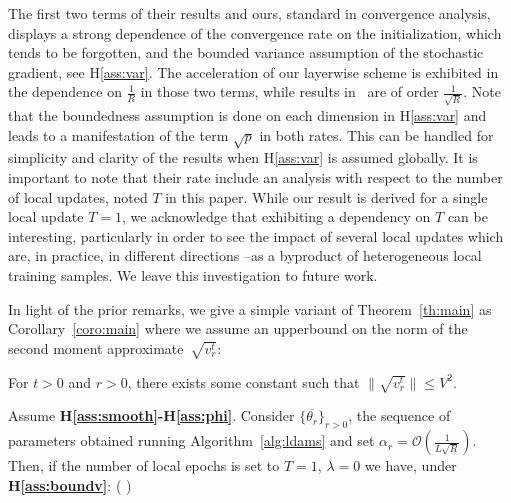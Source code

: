 \documentclass{article}
\begin{document}
The first two terms of their results and ours, standard in convergence analysis, displays a strong dependence of the convergence rate on the initialization, which tends to be forgotten, and the bounded variance assumption of the stochastic gradient, see H\ref{ass:var}.
The acceleration of our layerwise scheme is exhibited in the dependence on $\frac{1}{R}$ in those two terms, while results in~\citet{chen2020toward} are of order $\frac{1}{\sqrt{R}}$.
Note that the boundedness assumption is done on each dimension in H\ref{ass:var} and leads to a manifestation of the term $\sqrt{p}$ in both rates. This can be handled for simplicity and clarity of the results when H\ref{ass:var} is assumed globally.
It is important to note that their rate include an analysis with respect to the number of local updates, noted $T$ in this paper.
While our result is derived for a single local update $T=1$, we acknowledge that exhibiting a dependency on $T$ can be interesting, particularly in order to see the impact of several local updates which are, in practice, in different directions --as a byproduct of heterogeneous local training samples.
We leave this investigation to future work.

\medskip

In light of the prior remarks, we give a simple variant of Theorem~\ref{th:main} as Corollary~\ref{coro:main} where we assume an upperbound on the norm of the second moment approximate~$\sqrt{ v_r^t}$:

\begin{assumption}\label{ass:boundv}
For $t >0$ and $r>0$, there exists some constant such that $\| \sqrt{ v_r^t} \| \leq V^2 $.
\end{assumption}

\begin{coro}\label{coro:main}
Assume \textbf{H\ref{ass:smooth}-H\ref{ass:phi}}. Consider $\{\overline{\theta_r}\}_{r>0}$, the sequence of parameters obtained running Algorithm~\ref{alg:ldams} and set $\alpha_r = \mathcal{O}(\frac{1}{L \sqrt{R}})$. Then, if the number of local epochs is set to $T=1$, $\lambda = 0$ we have, under \textbf{H\ref{ass:boundv}}:
\beq \label{bound1coro}
 \EE{} \leq {}\left(  \right)
\eeq
\end{coro}
\end{document}
